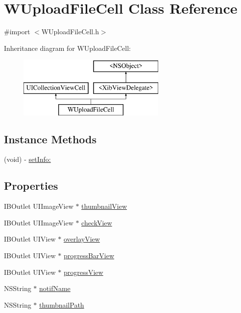 \hypertarget{interface_w_upload_file_cell}{\section{W\-Upload\-File\-Cell Class Reference}
\label{interface_w_upload_file_cell}
}


{\ttfamily \#import $<$W\-Upload\-File\-Cell.\-h$>$}

Inheritance diagram for W\-Upload\-File\-Cell\-:\begin{figure}[H]
\begin{center}
\leavevmode
\includegraphics[height=3.000000cm]{interface_w_upload_file_cell}
\end{center}
\end{figure}
\subsection*{Instance Methods}
\begin{DoxyCompactItemize}
\item 
(void) -\/ \hyperlink{interface_w_upload_file_cell_a7d41cde0c86e7655d6f42c678d4d7924}{set\-Info\-:}
\end{DoxyCompactItemize}
\subsection*{Properties}
\begin{DoxyCompactItemize}
\item 
I\-B\-Outlet U\-I\-Image\-View $\ast$ \hyperlink{interface_w_upload_file_cell_a15a832bb919591e9535ca755d16fa973}{thumbnail\-View}
\item 
I\-B\-Outlet U\-I\-Image\-View $\ast$ \hyperlink{interface_w_upload_file_cell_aec33dfb9545060a1d47461ec7b895915}{check\-View}
\item 
I\-B\-Outlet U\-I\-View $\ast$ \hyperlink{interface_w_upload_file_cell_a72acccc03a03c9d494151be96d0d6dff}{overlay\-View}
\item 
I\-B\-Outlet U\-I\-View $\ast$ \hyperlink{interface_w_upload_file_cell_a5ad3b46350163fe8b95d3575c5570f04}{progress\-Bar\-View}
\item 
I\-B\-Outlet U\-I\-View $\ast$ \hyperlink{interface_w_upload_file_cell_aeb2e8068ff8c8de4ad2ad79e6278c339}{progress\-View}
\item 
N\-S\-String $\ast$ \hyperlink{interface_w_upload_file_cell_a0ef03dfb445e19004487fb9772a7577e}{notif\-Name}
\item 
N\-S\-String $\ast$ \hyperlink{interface_w_upload_file_cell_a1307d58613ef20d607a04c4a5d421aca}{thumbnail\-Path}
\end{DoxyCompactItemize}
